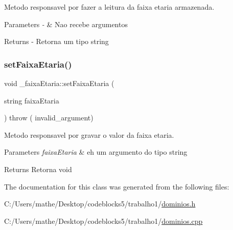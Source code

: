 Metodo responsavel por fazer a leitura da faixa etaria armazenada. 


\begin{DoxyParams}{Parameters}
{\em -\/} & Nao recebe argumentos \\
\hline
\end{DoxyParams}
\begin{DoxyReturn}{Returns}
-\/ Retorna um tipo string 
\end{DoxyReturn}
\mbox{\label{class__faixa_etaria_a78ad0280095c12e28b59dfc5b32536ed}} 
\subsubsection{\texorpdfstring{setFaixaEtaria()}{setFaixaEtaria()}}
{\footnotesize\ttfamily void \+\_\+faixa\+Etaria\+::set\+Faixa\+Etaria (\begin{DoxyParamCaption}\item[{string}]{faixa\+Etaria }\end{DoxyParamCaption}) throw ( invalid\+\_\+argument) }



Metodo responsavel por gravar o valor da faixa etaria. 


\begin{DoxyParams}{Parameters}
{\em faixa\+Etaria} & eh um argumento do tipo string \\
\hline
\end{DoxyParams}
\begin{DoxyReturn}{Returns}
Retorna void 
\end{DoxyReturn}


The documentation for this class was generated from the following files\+:\begin{DoxyCompactItemize}
\item 
C\+:/\+Users/mathe/\+Desktop/codeblocks5/trabalho1/\mbox{\hyperlink{dominios_8h}{dominios.\+h}}\item 
C\+:/\+Users/mathe/\+Desktop/codeblocks5/trabalho1/\mbox{\hyperlink{dominios_8cpp}{dominios.\+cpp}}\end{DoxyCompactItemize}
